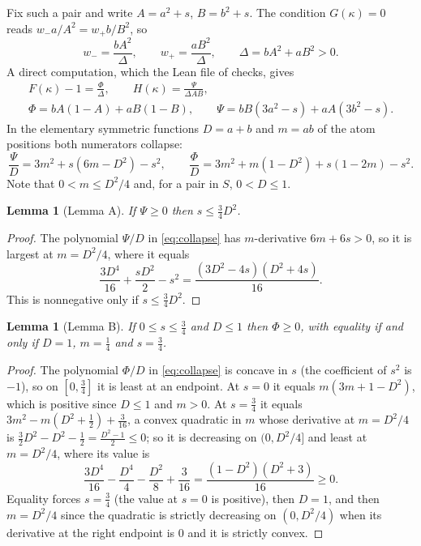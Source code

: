 \documentclass[11pt]{amsart}
\newtheorem{lemma}[theorem]{Lemma}
\theoremstyle{definition}
\begin{document}
Fix such a pair and write $A=a^2+s$, $B=b^2+s$. The condition $G(\kappa)=0$ reads $w_-a/A^2=w_+b/B^2$, so
\[
w_-=\frac{bA^2}{\Delta},\qquad w_+=\frac{aB^2}{\Delta},\qquad \Delta=bA^2+aB^2>0.
\]
A direct computation, which the Lean file of  checks, gives
\begin{equation}\label{eq:pairFH}
\begin{gathered}
F(\kappa)-1=\frac{\Phi}{\Delta},\qquad H(\kappa)=\frac{\Psi}{\Delta AB},\\
\Phi=bA(1-A)+aB(1-B),\qquad \Psi=bB(3a^2-s)+aA(3b^2-s).
\end{gathered}
\end{equation}
In the elementary symmetric functions $D=a+b$ and $m=ab$ of the atom positions both numerators collapse:
\begin{equation}\label{eq:collapse}
\frac{\Psi}{D}=3m^2+s(6m-D^2)-s^2,\qquad
\frac{\Phi}{D}=3m^2+m(1-D^2)+s(1-2m)-s^2.
\end{equation}
Note that $0<m\le D^2/4$ and, for a pair in $S$, $0<D\le1$.

\begin{lemma}[Lemma A]\label{lem:A}
If $\Psi\ge0$ then $s\le\frac34D^2$.
\end{lemma}

\begin{proof}
The polynomial $\Psi/D$ in \eqref{eq:collapse} has $m$-derivative $6m+6s>0$, so it is largest at $m=D^2/4$, where it equals
\[
\frac{3D^4}{16}+\frac{sD^2}{2}-s^2=\frac{(3D^2-4s)(D^2+4s)}{16}.
\]
This is nonnegative only if $s\le\frac34D^2$.
\end{proof}

\begin{lemma}[Lemma B]\label{lem:B}
If $0\le s\le\frac34$ and $D\le1$ then $\Phi\ge0$, with equality if and only if $D=1$, $m=\frac14$ and $s=\frac34$.
\end{lemma}

\begin{proof}
The polynomial $\Phi/D$ in \eqref{eq:collapse} is concave in $s$ (the coefficient of $s^2$ is $-1$), so on $[0,\frac34]$ it is least at an endpoint. At $s=0$ it equals $m(3m+1-D^2)$, which is positive since $D\le1$ and $m>0$. At $s=\frac34$ it equals $3m^2-m(D^2+\frac12)+\frac3{16}$, a convex quadratic in $m$ whose derivative at $m=D^2/4$ is $\frac32D^2-D^2-\frac12=\frac{D^2-1}2\le0$; so it is decreasing on $(0,D^2/4]$ and least at $m=D^2/4$, where its value is
\[
\frac{3D^4}{16}-\frac{D^4}{4}-\frac{D^2}8+\frac3{16}=\frac{(1-D^2)(D^2+3)}{16}\ge0.
\]
Equality forces $s=\frac34$ (the value at $s=0$ is positive), then $D=1$, and then $m=D^2/4$ since the quadratic is strictly decreasing on $(0,D^2/4)$ when its derivative at the right endpoint is $0$ and it is strictly convex.
\end{proof}
\end{document}
